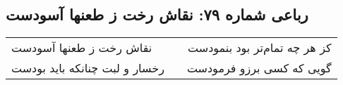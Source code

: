 \begin{center}
\section*{رباعی شماره ۷۹: نقاش رخت ز طعنها آسودست}
\label{sec:sh079}
\begin{longtable}{l p{0.5cm} r}
نقاش رخت ز طعنها آسودست
&&
کز هر چه تمام‌تر بود بنمودست
\\
رخسار و لبت چنانکه باید بودست
&&
گویی که کسی برزو فرمودست
\\
\end{longtable}
\end{center}
